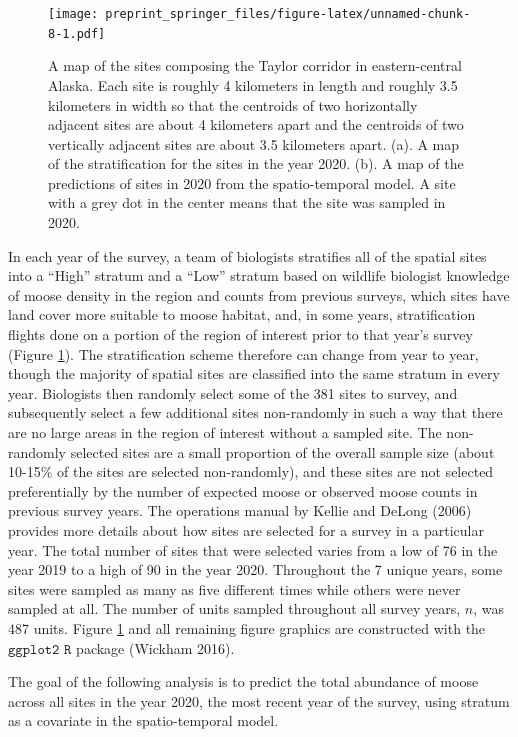 \documentclass[smallextended]{svjour3}       %
\begin{document}
\begin{figure}
\centering
\texttt{[image: preprint\_springer\_files/figure-latex/unnamed-chunk-8-1.pdf]}
\caption{\label{fig:sitepredmap} A map of the sites composing the Taylor
corridor in eastern-central Alaska. Each site is roughly 4 kilometers in
length and roughly 3.5 kilometers in width so that the centroids of two
horizontally adjacent sites are about 4 kilometers apart and the
centroids of two vertically adjacent sites are about 3.5 kilometers
apart. (a). A map of the stratification for the sites in the year 2020.
(b). A map of the predictions of sites in 2020 from the spatio-temporal
model. A site with a grey dot in the center means that the site was
sampled in 2020.}
\end{figure}

In each year of the survey, a team of biologists stratifies all of the
spatial sites into a ``High'' stratum and a ``Low'' stratum based on
wildlife biologist knowledge of moose density in the region and counts
from previous surveys, which sites have land cover more suitable to
moose habitat, and, in some years, stratification flights done on a
portion of the region of interest prior to that year's survey (Figure
\ref{fig:sitepredmap}). The stratification scheme therefore can change
from year to year, though the majority of spatial sites are classified
into the same stratum in every year. Biologists then randomly select
some of the 381 sites to survey, and subsequently select a few
additional sites non-randomly in such a way that there are no large
areas in the region of interest without a sampled site. The non-randomly
selected sites are a small proportion of the overall sample size (about
10-15\% of the sites are selected non-randomly), and these sites are not
selected preferentially by the number of expected moose or observed
moose counts in previous survey years. The operations manual by Kellie
and DeLong (2006) provides more details about how sites are selected for
a survey in a particular year. The total number of sites that were
selected varies from a low of 76 in the year 2019 to a high of 90 in the
year 2020. Throughout the 7 unique years, some sites were sampled as
many as five different times while others were never sampled at all. The
number of units sampled throughout all survey years, \(n\), was 487
units. Figure \ref{fig:sitepredmap} and all remaining figure graphics
are constructed with the \(\texttt{ggplot2 R}\) package (Wickham 2016).

The goal of the following analysis is to predict the total abundance of
moose across all sites in the year 2020, the most recent year of the
survey, using stratum as a covariate in the spatio-temporal model.
\end{document}

